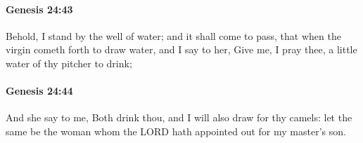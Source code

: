 		\paragraph{Genesis 24:43} %
			\label{GENESIS-24-43}

			Behold, I stand by the well of water; and it shall come to pass, that when the virgin cometh forth to draw water, and I say to her, Give me, I pray thee, a little water of thy pitcher to drink;


		\paragraph{Genesis 24:44} %
			\label{GENESIS-24-44}

			And she say to me, Both drink thou, and I will also draw for thy camels: let the same be the woman whom the LORD hath appointed out for my master's son.


